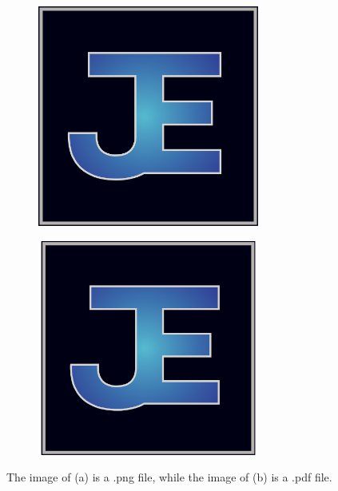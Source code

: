 \documentclass[letterpaper,12pt]{article}
\begin{document}
\begin{figure}[h]
    \centering
    \begin{subfigure}[b]{0.45\textwidth}
    	\centering
        \includegraphics[width=0.8\textwidth]{JTE_Logo_PNG.PNG}
        \caption{}
        \label{fig:JTE_Logo_PNG}
    \end{subfigure}
    \begin{subfigure}[b]{0.45\textwidth}
    	\centering
        \includegraphics[width=0.8\textwidth]{JTE_Logo_PDF.PDF}
        \caption{}
        \label{fig:JTE_Logo_PDF}
    \end{subfigure}
 	
    \caption{The image of (a) is a .png file, while the image of (b) is a .pdf file.}
    \label{fig:Multiple_Figures}
\end{figure}
\end{document}
